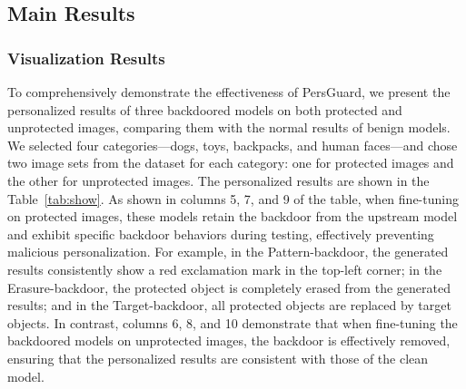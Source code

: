 

\subsection{Main Results}

\subsubsection{Visualization Results}
To comprehensively demonstrate the effectiveness of PersGuard, we present the personalized results of three backdoored models on both protected and unprotected images, comparing them with the normal results of benign models. We selected four categories—dogs, toys, backpacks, and human faces—and chose two image sets from the dataset for each category: one for protected images and the other for unprotected images. The personalized results are shown in the Table~\ref{tab:show}. As shown in columns 5, 7, and 9 of the table, when fine-tuning on protected images, these models retain the backdoor from the upstream model and exhibit specific backdoor behaviors during testing, effectively preventing malicious personalization. For example, in the Pattern-backdoor, the generated results consistently show a red exclamation mark in the top-left corner; in the Erasure-backdoor, the protected object is completely erased from the generated results; and in the Target-backdoor, all protected objects are replaced by target objects. In contrast, columns 6, 8, and 10 demonstrate that when fine-tuning the backdoored models on unprotected images, the backdoor is effectively removed, ensuring that the personalized results are consistent with those of the clean model. 

